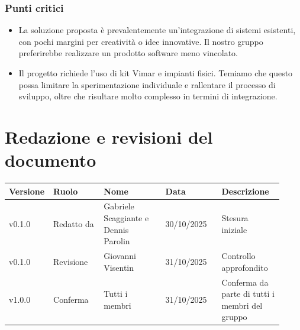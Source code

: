 \documentclass[a4paper,12pt]{article}
\begin{document}
\subsubsection{Punti critici}
\begin{itemize}
    \item La soluzione proposta è prevalentemente un’integrazione di sistemi esistenti, con pochi margini per creatività o idee innovative. Il nostro gruppo preferirebbe realizzare un prodotto software meno vincolato.
    \item Il progetto richiede l’uso di kit Vimar e impianti fisici. Temiamo che questo possa limitare la sperimentazione individuale e rallentare il processo di sviluppo, oltre che risultare molto complesso in termini di integrazione.
\end{itemize}



\clearpage
\section{Redazione e revisioni del documento}

\begin{center}
\small
\renewcommand{\arraystretch}{1.2} 
\begin{tabular}{|p{0.1\linewidth}|p{0.18\linewidth}|p{0.22\linewidth}|p{0.20\linewidth}|p{0.22\linewidth}|}
\hline
\rowcolor{gray!60} 
\textbf{Versione} & \textbf{Ruolo} & \textbf{Nome} & \textbf{Data} & \textbf{Descrizione} \\
\hline
\rowcolor{white}
v0.1.0 & Redatto da & Gabriele Scaggiante e Dennis Parolin & 30/10/2025 & Stesura iniziale \\
\hline
\rowcolor{gray!20}
v0.1.0 & Revisione & Giovanni Visentin & 31/10/2025 & Controllo approfondito  \\
\hline
\rowcolor{white}
v1.0.0 & Conferma & Tutti i membri & 31/10/2025 & Conferma da parte di tutti i membri del gruppo \\
\hline

\end{tabular}
\end{center}
\end{document}
